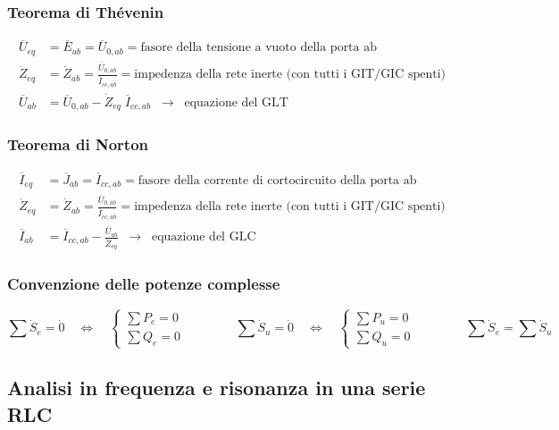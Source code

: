 \documentclass[a4paper]{article}
\begin{document}
\subsubsection*{Teorema di Thévenin}
\begin{align*}
	\overline{U}_{eq} &= \overline{E}_{ab} = \overline{U}_{0,ab} = \text{fasore della tensione a vuoto della porta ab} \\
	\dot{Z}_{eq} &= \dot{Z}_{ab} = \frac{\overline{U}_{0,ab}}{\overline{I}_{cc,ab}} = \text{impedenza della rete inerte (con tutti i GIT/GIC spenti)} \\
	\overline{U}_{ab} &= \overline{U}_{0,ab} - \dot{Z}_{eq} \; \overline{I}_{cc,ab} \;\;\rightarrow\;\; \text{equazione del GLT}
\end{align*}

\subsubsection*{Teorema di Norton}
\begin{align*}
	\overline{I}_{eq} &= \overline{J}_{ab} = \overline{I}_{cc,ab} = \text{fasore della corrente di cortocircuito della porta ab} \\
	\dot{Z}_{eq} &= \dot{Z}_{ab} = \frac{\overline{U}_{0,ab}}{\overline{I}_{cc,ab}} = \text{impedenza della rete inerte (con tutti i GIT/GIC spenti)} \\
	\overline{I}_{ab} &= \overline{I}_{cc,ab} - \frac{\overline{U}_{ab}}{\dot{Z}_{eq}} \;\;\rightarrow\;\; \text{equazione del GLC}
\end{align*}

\subsubsection*{Convenzione delle potenze complesse}
\[\sum \dot{S}_e = \dot{0} \quad \Leftrightarrow \quad \begin{cases}
	\sum P_e = 0 \\
	\sum Q_e = 0
\end{cases} \qquad \qquad \sum \dot{S}_u = \dot{0} \quad \Leftrightarrow \quad \begin{cases}
	\sum P_u = 0 \\
	\sum Q_u = 0
\end{cases} \qquad \qquad \sum \dot{S}_e = \sum \dot{S}_u\]

\newpage

\subsection{Analisi in frequenza e risonanza in una serie RLC}
\end{document}
